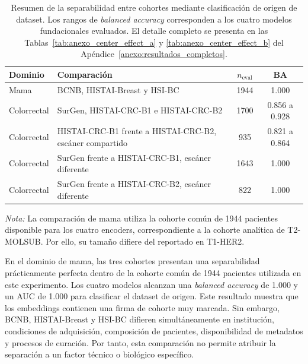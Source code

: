 \begin{table}[htbp]
\centering
\caption{Resumen de la separabilidad entre cohortes mediante clasificación de origen de dataset. Los rangos de \textit{balanced accuracy} corresponden a los cuatro modelos fundacionales evaluados. El detalle completo se presenta en las Tablas~\ref{tab:anexo_center_effect_a} y \ref{tab:anexo_center_effect_b} del Apéndice~\ref{anexo:resultados_completos}.}
\label{tab:center_effect}
\small
\begin{tabular}{p{3.0cm} p{5.6cm} c c}
\toprule
\textbf{Dominio} & \textbf{Comparación} &
\textbf{$n_{\text{eval}}$} & \textbf{BA} \\
\midrule
Mama &
BCNB, HISTAI-Breast y HSI-BC &
1944 &
1.000 \\

Colorrectal &
SurGen, HISTAI-CRC-B1 e HISTAI-CRC-B2 &
1700 &
0.856 a 0.928 \\

Colorrectal &
HISTAI-CRC-B1 frente a HISTAI-CRC-B2, escáner compartido &
935 &
0.821 a 0.864 \\

Colorrectal &
SurGen frente a HISTAI-CRC-B1, escáner diferente &
1643 &
1.000 \\

Colorrectal &
SurGen frente a HISTAI-CRC-B2, escáner diferente &
822 &
1.000 \\
\bottomrule
\end{tabular}

\medskip
\footnotesize
\parbox{0.95\textwidth}{\textit{Nota:} La comparación de mama utiliza la cohorte común de 1944 pacientes disponible para los cuatro encoders, correspondiente a la cohorte analítica de T2-MOLSUB. Por ello, su tamaño difiere del reportado en T1-HER2.}
\end{table}

En el dominio de mama, las tres cohortes presentan una separabilidad prácticamente perfecta dentro de la cohorte común de 1944 pacientes utilizada en este experimento. Los cuatro modelos alcanzan una \textit{balanced accuracy} de 1.000 y un AUC de 1.000 para clasificar el dataset de origen. Este resultado muestra que los embeddings contienen una firma de cohorte muy marcada. Sin embargo, BCNB, HISTAI-Breast y HSI-BC difieren simultáneamente en institución, condiciones de adquisición, composición de pacientes, disponibilidad de metadatos y procesos de curación. Por tanto, esta comparación no permite atribuir la separación a un factor técnico o biológico específico.

